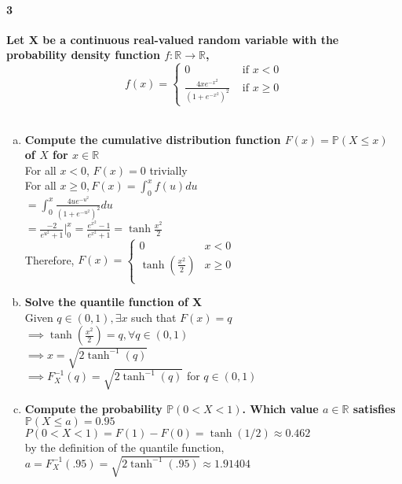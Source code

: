 \documentclass[10pt,letterpaper]{article}
\begin{document}
\paragraph{3}
\textbf{Let X be a continuous real-valued random variable with the probability density
function $f: \mathbb{R} \xrightarrow{} \mathbb{R}$,
$$f(x) = \begin{cases}
    0 & \text{ if } x < 0\\
    \frac{4xe^{-x^2}}{(1+e^{-x^2})^2} & \text{ if } x \geq 0
\end{cases}$$}\\
\begin{enumerate}[(a)]
    \item \textbf{Compute the cumulative distribution function $F(x) = \mathbb{P}(X \leq x)$ of $X$ for $x \in \mathbb{R}$}\\
    For all $x < 0$, $F(x) = 0$ trivially\\
    For all $x \geq 0, F(x) = \int_{0}^{x} f(u) du$\\
    $= \int_{0}^{x} \frac{4ue^{-u^2}}{(1+e^{-u^2})^2} du$\\
    $= \frac{-2}{e^{u^2}+1}|_{0}^{x} = \frac{e^{x^2}-1}{e^{x^2}+1} = \tanh{\frac{x^2}{2}}$\\
    Therefore,
    $F(x) = \begin{cases}
        0 & x < 0\\
        \tanh(\frac{x^2}{2}) & x \geq 0\\
    \end{cases}$

    \item \textbf{Solve the quantile function of X}\\
    Given $q \in (0,1), \exists x$ such that $F(x) = q$\\
    $\implies \tanh(\frac{x^2}{2}) = q, \forall q\in (0,1)$\\
    $\implies x = \sqrt{2\tanh^{-1}(q)}$\\
    $\implies F_X^{-1}(q)= \sqrt{2\tanh^{-1}(q)}$ for $q\in (0,1)$

    \item \textbf{Compute the probability $\mathbb{P}(0 < X < 1)$. Which value $a\in \mathbb{R}$ satisfies $\mathbb{P}(X \leq a) = 0.95$}\\
    $P(0 < X < 1) = F(1) - F(0) = \tanh(1/2) \approx 0.462$\\
    by the definition of the quantile function, $a = F_X^{-1}(.95) = \sqrt{2\tanh^{-1}(.95)} \approx 1.91404$
\end{enumerate}
\end{document}
